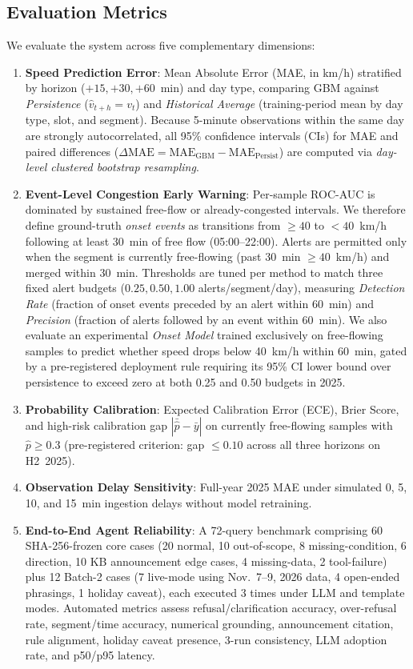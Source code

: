 \documentclass[conference]{IEEEtran}
\begin{document}
\subsection{Evaluation Metrics}
We evaluate the system across five complementary dimensions:
\begin{enumerate}
    \item \textbf{Speed Prediction Error}: Mean Absolute Error (MAE, in km/h) stratified by horizon ($+15, +30, +60$~min) and day type, comparing GBM against \emph{Persistence} ($\hat{v}_{t+h} = v_t$) and \emph{Historical Average} (training-period mean by day type, slot, and segment). Because 5-minute observations within the same day are strongly autocorrelated, all 95\% confidence intervals (CIs) for MAE and paired differences ($\Delta\text{MAE} = \text{MAE}_{\text{GBM}} - \text{MAE}_{\text{Persist}}$) are computed via \emph{day-level clustered bootstrap resampling}.
    \item \textbf{Event-Level Congestion Early Warning}: Per-sample ROC-AUC is dominated by sustained free-flow or already-congested intervals. We therefore define ground-truth \emph{onset events} as transitions from $\ge 40$ to $< 40$~km/h following at least 30~min of free flow (05:00--22:00). Alerts are permitted only when the segment is currently free-flowing (past 30~min $\ge 40$~km/h) and merged within 30~min. Thresholds are tuned per method to match three fixed alert budgets ($0.25, 0.50, 1.00$ alerts/segment/day), measuring \emph{Detection Rate} (fraction of onset events preceded by an alert within 60~min) and \emph{Precision} (fraction of alerts followed by an event within 60~min). We also evaluate an experimental \emph{Onset Model} trained exclusively on free-flowing samples to predict whether speed drops below 40~km/h within 60~min, gated by a pre-registered deployment rule requiring its 95\% CI lower bound over persistence to exceed zero at both 0.25 and 0.50 budgets in 2025.
    \item \textbf{Probability Calibration}: Expected Calibration Error (ECE), Brier Score, and high-risk calibration gap $|\bar{\hat{p}} - \bar{y}|$ on currently free-flowing samples with $\hat{p} \ge 0.3$ (pre-registered criterion: gap $\le 0.10$ across all three horizons on H2~2025).
    \item \textbf{Observation Delay Sensitivity}: Full-year 2025 MAE under simulated 0, 5, 10, and 15~min ingestion delays without model retraining.
    \item \textbf{End-to-End Agent Reliability}: A 72-query benchmark comprising 60 SHA-256-frozen core cases (20 normal, 10 out-of-scope, 8 missing-condition, 6 direction, 10 KB announcement edge cases, 4 missing-data, 2 tool-failure) plus 12 Batch-2 cases (7 live-mode using Nov.~7--9, 2026 data, 4 open-ended phrasings, 1 holiday caveat), each executed 3 times under LLM and template modes. Automated metrics assess refusal/clarification accuracy, over-refusal rate, segment/time accuracy, numerical grounding, announcement citation, rule alignment, holiday caveat presence, 3-run consistency, LLM adoption rate, and p50/p95 latency.
\end{enumerate}
\end{document}
